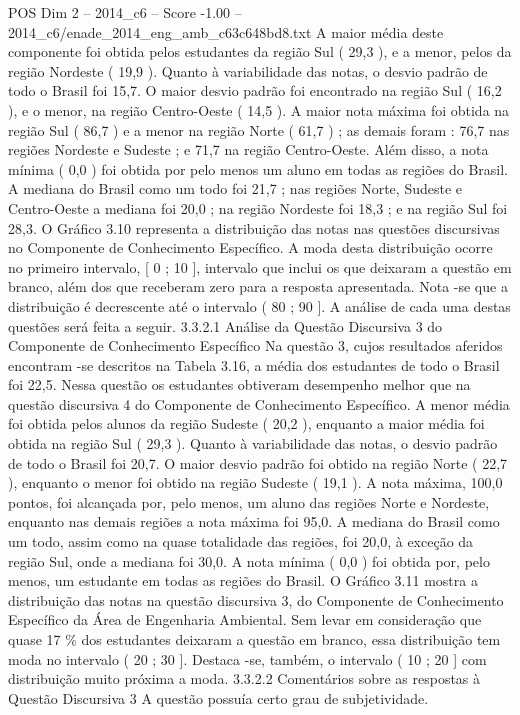 \begin{textsample}{POS Dim 2 – 2014\_c6 – Score -1.00 – 2014\_c6/enade\_2014\_eng\_amb\_c63c648bd8.txt}
A maior média deste componente foi obtida pelos estudantes da região Sul ( 29,3 ), e a menor, pelos da região Nordeste ( 19,9 ).
Quanto à variabilidade das notas, o desvio padrão de todo o Brasil foi 15,7.
O maior desvio padrão foi encontrado na região Sul ( 16,2 ), e o menor, na região Centro-Oeste ( 14,5 ).
A maior nota máxima foi obtida na região Sul ( 86,7 ) e a menor na região Norte ( 61,7 ) ; as demais foram : 76,7 nas regiões Nordeste e Sudeste ; e 71,7 na região Centro-Oeste.
Além disso, a nota mínima ( 0,0 ) foi obtida por pelo menos um aluno em todas as regiões do Brasil.
A mediana do Brasil como um todo foi 21,7 ; nas regiões Norte, Sudeste e Centro-Oeste a mediana foi 20,0 ; na região Nordeste foi 18,3 ; e na região Sul foi 28,3.
O Gráfico 3.10 representa a distribuição das notas nas questões discursivas no Componente de Conhecimento Específico.
A moda desta distribuição ocorre no primeiro intervalo, [ 0 ; 10 ], intervalo que inclui os que deixaram a questão em branco, além dos que receberam zero para a resposta apresentada.
Nota -se que a distribuição é decrescente até o intervalo ( 80 ; 90 ].
A análise de cada uma destas questões será feita a seguir. 3.3.2.1 Análise da Questão Discursiva 3 do Componente de Conhecimento Específico Na questão 3, cujos resultados aferidos encontram -se descritos na Tabela 3.16, a média dos estudantes de todo o Brasil foi 22,5.
Nessa questão os estudantes obtiveram desempenho melhor que na questão discursiva 4 do Componente de Conhecimento Específico.
A menor média foi obtida pelos alunos da região Sudeste ( 20,2 ), enquanto a maior média foi obtida na região Sul ( 29,3 ).
Quanto à variabilidade das notas, o desvio padrão de todo o Brasil foi 20,7.
O maior desvio padrão foi obtido na região Norte ( 22,7 ), enquanto o menor foi obtido na região Sudeste ( 19,1 ).
A nota máxima, 100,0 pontos, foi alcançada por, pelo menos, um aluno das regiões Norte e Nordeste, enquanto nas demais regiões a nota máxima foi 95,0.
A mediana do Brasil como um todo, assim como na quase totalidade das regiões, foi 20,0, à exceção da região Sul, onde a mediana foi 30,0.
A nota mínima ( 0,0 ) foi obtida por, pelo menos, um estudante em todas as regiões do Brasil.
O Gráfico 3.11 mostra a distribuição das notas na questão discursiva 3, do Componente de Conhecimento Específico da Área de Engenharia Ambiental.
Sem levar em consideração que quase 17 \% dos estudantes deixaram a questão em branco, essa distribuição tem moda no intervalo ( 20 ; 30 ].
Destaca -se, também, o intervalo ( 10 ; 20 ] com distribuição muito próxima a moda. 3.3.2.2 Comentários sobre as respostas à Questão Discursiva 3 A questão possuía certo grau de subjetividade.

\end{textsample}
